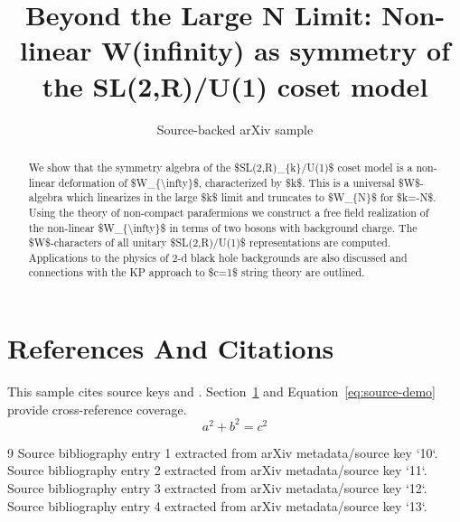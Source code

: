 \documentclass[11pt]{article}
\title{Beyond the Large N Limit: Non-linear W(infinity) as symmetry of the
  SL(2,R)/U(1) coset model}
\author{Source-backed arXiv sample}
\date{}
\begin{document}
\maketitle
\begin{abstract}
We show that the symmetry algebra of the \$SL(2,R)\_\{k\}/U(1)\$ coset model is a non-linear deformation of \$W\_\{\textbackslash{}infty\}\$, characterized by \$k\$. This is a universal \$W\$-algebra which linearizes in the large \$k\$ limit and truncates to \$W\_\{N\}\$ for \$k=-N\$. Using the theory of non-compact parafermions we construct a free field realization of the non-linear \$W\_\{\textbackslash{}infty\}\$ in terms of two bosons with background charge. The \$W\$-characters of all unitary \$SL(2,R)/U(1)\$ representations are computed. Applications to the physics of 2-d black hole backgrounds are also discussed and connections with the KP approach to \$c=1\$ string theory are outlined.
\end{abstract}
\section{References And Citations}
\label{sec:refs}
This sample cites source keys \cite{10} and \cite{11}. Section~\ref{sec:refs} and Equation~\ref{eq:source-demo} provide cross-reference coverage.
\begin{equation}
\label{eq:source-demo}
a^2 + b^2 = c^2
\end{equation}
\begin{thebibliography}{9}
 Source bibliography entry 1 extracted from arXiv metadata/source key `10`.
 Source bibliography entry 2 extracted from arXiv metadata/source key `11`.
 Source bibliography entry 3 extracted from arXiv metadata/source key `12`.
 Source bibliography entry 4 extracted from arXiv metadata/source key `13`.
\end{thebibliography}
\end{document}
